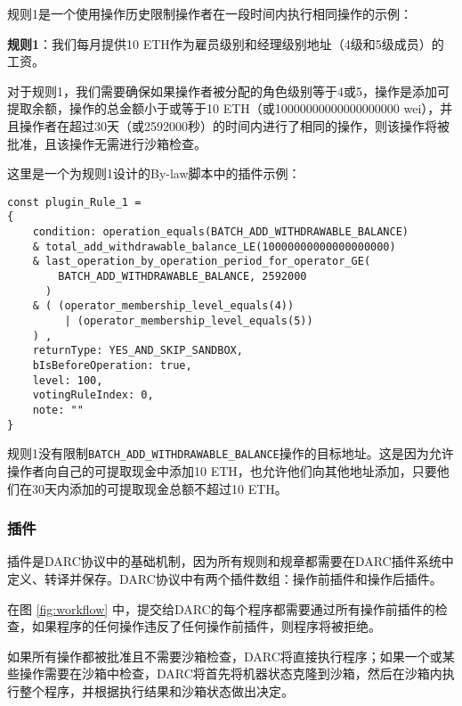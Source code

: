 \documentclass[main.tex]{subfiles}
\begin{document}
规则1是一个使用操作历史限制操作者在一段时间内执行相同操作的示例：

\textbf{规则1}：我们每月提供10 ETH作为雇员级别和经理级别地址（4级和5级成员）的工资。

对于规则1，我们需要确保如果操作者被分配的角色级别等于4或5，操作是添加可提取余额，操作的总金额小于或等于10 ETH（或10000000000000000000 wei），并且操作者在超过30天（或2592000秒）的时间内进行了相同的操作，则该操作将被批准，且该操作无需进行沙箱检查。

这里是一个为规则1设计的By-law脚本中的插件示例：

\begin{verbatim}
const plugin_Rule_1 = 
{
    condition: operation_equals(BATCH_ADD_WITHDRAWABLE_BALANCE)
    & total_add_withdrawable_balance_LE(10000000000000000000)
    & last_operation_by_operation_period_for_operator_GE(
        BATCH_ADD_WITHDRAWABLE_BALANCE, 2592000
      )
    & ( (operator_membership_level_equals(4)) 
         | (operator_membership_level_equals(5)) 
    ) ,
    returnType: YES_AND_SKIP_SANDBOX,
    bIsBeforeOperation: true,
    level: 100,
    votingRuleIndex: 0,
    note: ""
}
\end{verbatim}

规则1没有限制\texttt{BATCH\_ADD\_WITHDRAWABLE\_BALANCE}操作的目标地址。这是因为允许操作者向自己的可提取现金中添加10 ETH，也允许他们向其他地址添加，只要他们在30天内添加的可提取现金总额不超过10 ETH。

\subsubsection{插件}

插件是DARC协议中的基础机制，因为所有规则和规章都需要在DARC插件系统中定义、转译并保存。DARC协议中有两个插件数组：操作前插件和操作后插件。


在图 \ref{fig:workflow} 中，提交给DARC的每个程序都需要通过所有操作前插件的检查，如果程序的任何操作违反了任何操作前插件，则程序将被拒绝。

如果所有操作都被批准且不需要沙箱检查，DARC将直接执行程序；如果一个或某些操作需要在沙箱中检查，DARC将首先将机器状态克隆到沙箱，然后在沙箱内执行整个程序，并根据执行结果和沙箱状态做出决定。
\end{document}
